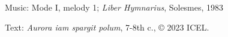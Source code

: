 \hymn




\medskip\begin{hymnsource}
Music: Mode I, melody 1; \emph{Liber Hymnarius}, Solesmes, 1983

Text: \emph{Aurora iam spargit polum}, 7-8th c., © 2023 ICEL.
\end{hymnsource}
